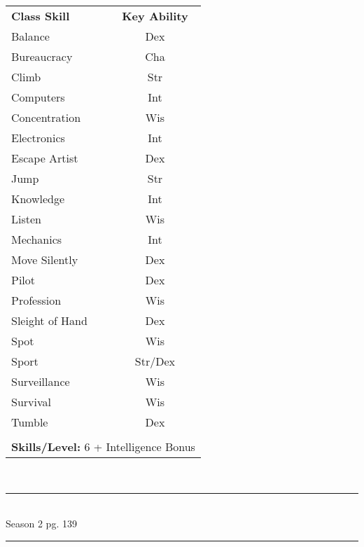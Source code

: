 \begin{table}[htb]
\raggedright
\begin{tabular}{l c}
\textbf{Class Skill} & \textbf{Key Ability}\\

Balance & Dex\\
Bureaucracy & Cha\\
Climb & Str\\
Computers & Int\\
Concentration & Wis\\
Electronics & Int\\
Escape Artist & Dex\\
Jump & Str\\
Knowledge & Int\\
Listen & Wis\\
Mechanics & Int\\
Move Silently & Dex\\
Pilot & Dex\\
Profession & Wis\\
Sleight of Hand & Dex\\
Spot & Wis\\
Sport & Str/Dex\\
Surveillance & Wis\\
Survival & Wis\\
Tumble & Dex\\


\multicolumn{2}{l}{\cellcolor{white}}\\
\multicolumn{2}{l}{\cellcolor{white}\textbf{Skills/Level:} 6 + Intelligence Bonus}\\
\end{tabular}
\end{table}

\setlength{\intextsep}{14.0pt plus 4.0pt minus 4.0pt}

\vspace*{3cm}

\vspace*{\fill}

\begin{center}
\textsc{\Large}\\[0.25cm]
\rule{\linewidth}{0.5mm}\\[0.6cm]
\fontsize{30}{30} \selectfont Season 2 pg. 139\\
\rule{\linewidth}{0.5mm}\\[0.6cm]
\vfill
\end{center}

\pagebreak



